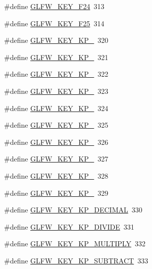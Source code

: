 \begin{DoxyCompactItemize}
\item 
\#define \hyperlink{group__keys_ga8150374677b5bed3043408732152dea2}{G\+L\+F\+W\+\_\+\+K\+E\+Y\+\_\+\+F24}~313
\item 
\#define \hyperlink{group__keys_gaa4bbd93ed73bb4c6ae7d83df880b7199}{G\+L\+F\+W\+\_\+\+K\+E\+Y\+\_\+\+F25}~314
\item 
\#define \hyperlink{group__keys_ga10515dafc55b71e7683f5b4fedd1c70d}{G\+L\+F\+W\+\_\+\+K\+E\+Y\+\_\+\+K\+P\+\_}~320
\item 
\#define \hyperlink{group__keys_gaf3a29a334402c5eaf0b3439edf5587c3}{G\+L\+F\+W\+\_\+\+K\+E\+Y\+\_\+\+K\+P\+\_}~321
\item 
\#define \hyperlink{group__keys_gaf82d5a802ab8213c72653d7480c16f13}{G\+L\+F\+W\+\_\+\+K\+E\+Y\+\_\+\+K\+P\+\_}~322
\item 
\#define \hyperlink{group__keys_ga7e25ff30d56cd512828c1d4ae8d54ef2}{G\+L\+F\+W\+\_\+\+K\+E\+Y\+\_\+\+K\+P\+\_}~323
\item 
\#define \hyperlink{group__keys_gada7ec86778b85e0b4de0beea72234aea}{G\+L\+F\+W\+\_\+\+K\+E\+Y\+\_\+\+K\+P\+\_}~324
\item 
\#define \hyperlink{group__keys_ga9a5be274434866c51738cafbb6d26b45}{G\+L\+F\+W\+\_\+\+K\+E\+Y\+\_\+\+K\+P\+\_}~325
\item 
\#define \hyperlink{group__keys_gafc141b0f8450519084c01092a3157faa}{G\+L\+F\+W\+\_\+\+K\+E\+Y\+\_\+\+K\+P\+\_}~326
\item 
\#define \hyperlink{group__keys_ga8882f411f05d04ec77a9563974bbfa53}{G\+L\+F\+W\+\_\+\+K\+E\+Y\+\_\+\+K\+P\+\_}~327
\item 
\#define \hyperlink{group__keys_gab2ea2e6a12f89d315045af520ac78cec}{G\+L\+F\+W\+\_\+\+K\+E\+Y\+\_\+\+K\+P\+\_}~328
\item 
\#define \hyperlink{group__keys_gafb21426b630ed4fcc084868699ba74c1}{G\+L\+F\+W\+\_\+\+K\+E\+Y\+\_\+\+K\+P\+\_}~329
\item 
\#define \hyperlink{group__keys_ga4e231d968796331a9ea0dbfb98d4005b}{G\+L\+F\+W\+\_\+\+K\+E\+Y\+\_\+\+K\+P\+\_\+\+D\+E\+C\+I\+M\+A\+L}~330
\item 
\#define \hyperlink{group__keys_gabca1733780a273d549129ad0f250d1e5}{G\+L\+F\+W\+\_\+\+K\+E\+Y\+\_\+\+K\+P\+\_\+\+D\+I\+V\+I\+D\+E}~331
\item 
\#define \hyperlink{group__keys_ga9ada267eb0e78ed2ada8701dd24a56ef}{G\+L\+F\+W\+\_\+\+K\+E\+Y\+\_\+\+K\+P\+\_\+\+M\+U\+L\+T\+I\+P\+L\+Y}~332
\item 
\#define \hyperlink{group__keys_gaa3dbd60782ff93d6082a124bce1fa236}{G\+L\+F\+W\+\_\+\+K\+E\+Y\+\_\+\+K\+P\+\_\+\+S\+U\+B\+T\+R\+A\+C\+T}~333

\end{DoxyCompactItemize}
